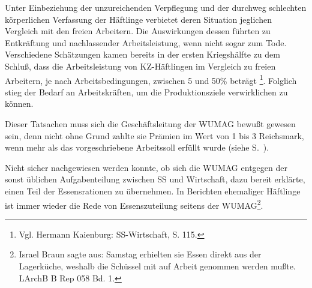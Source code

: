 Unter Einbeziehung der unzureichenden Verpflegung und der durchweg schlechten körperlichen Verfassung der Häftlinge verbietet deren Situation jeglichen Vergleich mit den freien Arbeitern. Die Auswirkungen dessen führten zu Entkräftung und nachlassender Arbeitsleistung, wenn nicht sogar zum Tode. Verschiedene Schätzungen kamen bereits in der ersten Kriegshälfte zu dem Schluß, dass die Arbeitsleistung von KZ-Häftlingen im Vergleich zu freien Arbeitern, je nach Arbeitsbedingungen, zwischen 5 und 50\% beträgt \footnote{Vgl. Hermann Kaienburg: SS-Wirtschaft, S. 115.}. Folglich stieg der Bedarf an Arbeitskräften, um die Produktionsziele verwirklichen zu können.

Dieser Tatsachen muss sich die Geschäftsleitung der WUMAG bewußt gewesen sein, denn nicht ohne Grund zahlte sie Prämien\label{pramie} im Wert von 1 bis 3 Reichsmark, wenn mehr als das vorgeschriebene Arbeitssoll erfüllt wurde (siehe S.~\pageref{pramien}).

Nicht sicher nachgewiesen werden konnte, ob sich die WUMAG entgegen der sonst üblichen Aufgabenteilung zwischen SS und Wirtschaft, dazu bereit erklärte, einen Teil der Essensrationen zu übernehmen. In Berichten ehemaliger Häftlinge ist immer wieder die Rede von Essenszuteilung seitens der WUMAG\footnote{Israel Braun sagte aus: \glqq Samstag erhielten sie Essen direkt aus der Lagerküche, weshalb die Schüssel mit auf Arbeit genommen werden mußte\grqq. LArchB B Rep 058 Bd. 1.}.

\label{muller}
